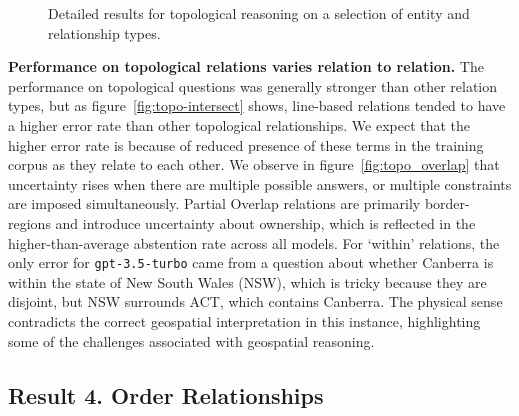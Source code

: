 \begin{figure}[h]
    \centering
    \hfill
    \hfill
    \caption{Detailed results for topological reasoning on a selection of entity and relationship types.}
    \label{fig:topo_plots}
\end{figure}

\textbf{Performance on topological relations varies relation to relation.}
The performance on topological questions was generally stronger than other relation types, but as figure~\ref{fig:topo-intersect} shows, line-based relations tended to have a higher error rate than other topological relationships. 
We expect that the higher error rate is because of reduced presence of these terms in the training corpus as they relate to each other. 
We observe in figure~\ref{fig:topo_overlap} that uncertainty rises when there are multiple possible answers, or multiple constraints are imposed simultaneously. 
Partial Overlap relations are primarily border-regions and introduce uncertainty about ownership, which is reflected in the higher-than-average abstention rate across all models.
For `within' relations, the only error for \texttt{gpt-3.5-turbo} came from a question about whether Canberra is within the state of New South Wales (NSW), which is tricky because they are disjoint, but NSW surrounds ACT, which contains Canberra. 
The physical sense contradicts the correct geospatial interpretation in this instance, highlighting some of the challenges associated with geospatial reasoning.



\subsection{Result 4. Order Relationships}

